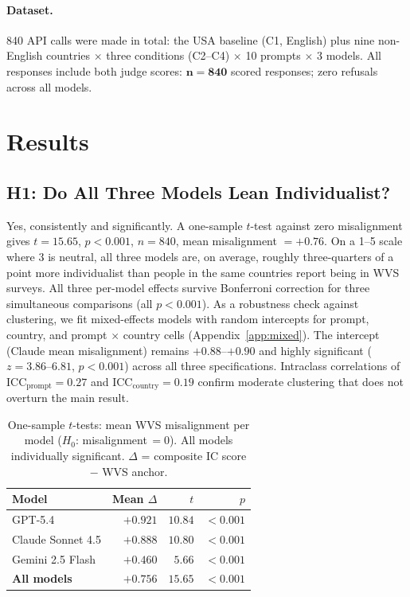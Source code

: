 \documentclass[11pt]{article}
\begin{document}
\vspace{-4pt}
\paragraph{Dataset.}
840 API calls were made in total: the USA baseline (C1, English) plus
nine non-English countries $\times$ three conditions (C2--C4) $\times$
10 prompts $\times$ 3 models.
All responses include both judge scores:
$\mathbf{n = 840}$ scored responses; zero refusals across all models.

\section{Results}

\subsection{H1: Do All Three Models Lean Individualist?}

Yes, consistently and significantly. A one-sample $t$-test against zero
misalignment gives $t = 15.65$, $p < 0.001$, $n = 840$, mean misalignment
$= +0.76$. On a 1--5 scale where 3 is neutral, all three models are, on
average, roughly three-quarters of a point more individualist than people in
the same countries report being in WVS surveys.
All three per-model effects survive Bonferroni correction for three
simultaneous comparisons (all $p < 0.001$).
As a robustness check against clustering, we fit mixed-effects models with
random intercepts for prompt, country, and prompt $\times$ country cells
(Appendix~\ref{app:mixed}). The intercept (Claude mean misalignment) remains
$+0.88$--$+0.90$ and highly significant ($z=3.86$--$6.81$, $p<0.001$)
across all three specifications. Intraclass correlations of
ICC$_\text{prompt}=0.27$ and ICC$_\text{country}=0.19$ confirm moderate
clustering that does not overturn the main result.

\begin{table}[h]
\small
\centering
\begin{tabular}{lrrr}
\toprule
\textbf{Model} & \textbf{Mean $\Delta$} & \textbf{$t$} & \textbf{$p$} \\
\midrule
GPT-5.4             & $+0.921$ & $10.84$ & $<0.001$ \\
Claude Sonnet 4.5   & $+0.888$ & $10.80$ & $<0.001$ \\
Gemini 2.5 Flash    & $+0.460$ & $5.66$  & $<0.001$ \\
\midrule
\textbf{All models} & $+0.756$ & $15.65$ & $<0.001$ \\
\bottomrule
\end{tabular}
\caption{One-sample $t$-tests: mean WVS misalignment per model
($H_0$: misalignment\,$= 0$). All models individually significant.
$\Delta$ = composite IC score $-$ WVS anchor.}
\label{tab:h1}
\end{table}
\end{document}
